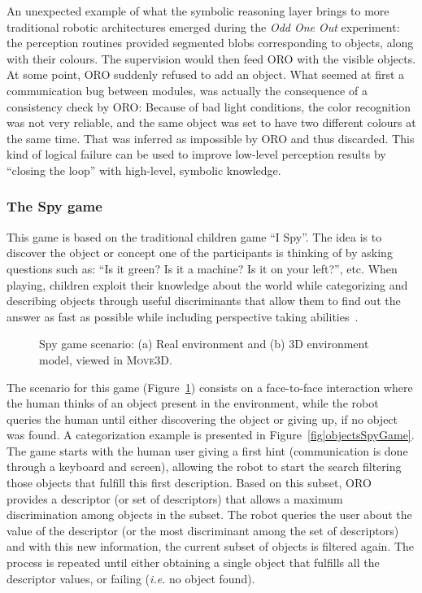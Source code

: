 An unexpected example of what the symbolic reasoning layer brings to more traditional robotic architectures emerged during the \emph{Odd One Out} experiment: the perception routines provided segmented blobs corresponding to objects, along with their colours. The supervision would then feed ORO with the visible objects. At some point, ORO suddenly refused to add an object. What seemed at first a communication bug between modules, was actually the consequence of a consistency check by ORO: Because of bad light conditions, the color recognition was not very reliable, and the same object was set to have two different colours at the same time. That was inferred as impossible by ORO and thus discarded. This kind of logical failure can be used to improve low-level perception results by ``closing the loop'' with high-level, symbolic knowledge.


\subsubsection{The Spy game}
\label{spygame}

This game is based on the traditional children game ``I Spy''. The idea is to discover the object or concept one of the participants is thinking of by asking questions such as: ``Is it green? Is it a machine? Is it on your left?'', etc. When playing, children exploit their knowledge about the world while categorizing and describing objects through useful discriminants that allow them to find out the answer as fast as possible while including perspective taking abilities~\cite{Moll2006}.

\begin{figure}
\centering

\caption{Spy game scenario: (a) Real environment and (b) 3D environment model, viewed in \textsc{Move3D}.}
\label{fig|spyGameScenario}
\end{figure}

The scenario for this game (Figure~\ref{fig|spyGameScenario}) consists on a face-to-face interaction where the human thinks of an object present in the environment, while the robot queries the human until either discovering the object or giving up, if no object was found. A categorization example is presented in Figure~\ref{fig|objectsSpyGame}. The game starts with the human user giving a first hint (communication is done through a keyboard and screen), allowing the robot to start the search filtering those objects that fulfill this first description. Based on this subset, ORO provides a descriptor (or set of descriptors) that allows a maximum discrimination among objects in the subset. The robot queries the user about the value of the descriptor (or the most discriminant among the set of descriptors) and with this new information, the current subset of objects is filtered again. The process is repeated until either obtaining a single object that fulfills all the descriptor values, or failing (\textit{i.e.} no object found). 

